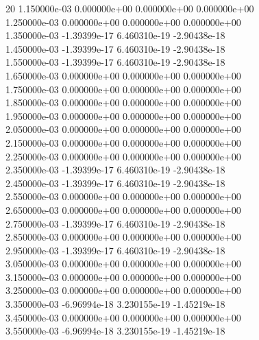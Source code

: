 20	1.150000e-03	0.000000e+00	0.000000e+00	0.000000e+00	\\ 	1.250000e-03	0.000000e+00	0.000000e+00	0.000000e+00	\\ 	1.350000e-03	-1.39399e-17	6.460310e-19	-2.90438e-18	\\ 	1.450000e-03	-1.39399e-17	6.460310e-19	-2.90438e-18	\\ 	1.550000e-03	-1.39399e-17	6.460310e-19	-2.90438e-18	\\ 	1.650000e-03	0.000000e+00	0.000000e+00	0.000000e+00	\\ 	1.750000e-03	0.000000e+00	0.000000e+00	0.000000e+00	\\ 	1.850000e-03	0.000000e+00	0.000000e+00	0.000000e+00	\\ 	1.950000e-03	0.000000e+00	0.000000e+00	0.000000e+00	\\ 	2.050000e-03	0.000000e+00	0.000000e+00	0.000000e+00	\\ 	2.150000e-03	0.000000e+00	0.000000e+00	0.000000e+00	\\ 	2.250000e-03	0.000000e+00	0.000000e+00	0.000000e+00	\\ 	2.350000e-03	-1.39399e-17	6.460310e-19	-2.90438e-18	\\ 	2.450000e-03	-1.39399e-17	6.460310e-19	-2.90438e-18	\\ 	2.550000e-03	0.000000e+00	0.000000e+00	0.000000e+00	\\ 	2.650000e-03	0.000000e+00	0.000000e+00	0.000000e+00	\\ 	2.750000e-03	-1.39399e-17	6.460310e-19	-2.90438e-18	\\ 	2.850000e-03	0.000000e+00	0.000000e+00	0.000000e+00	\\ 	2.950000e-03	-1.39399e-17	6.460310e-19	-2.90438e-18	\\ 	3.050000e-03	0.000000e+00	0.000000e+00	0.000000e+00	\\ 	3.150000e-03	0.000000e+00	0.000000e+00	0.000000e+00	\\ 	3.250000e-03	0.000000e+00	0.000000e+00	0.000000e+00	\\ 	3.350000e-03	-6.96994e-18	3.230155e-19	-1.45219e-18	\\ 	3.450000e-03	0.000000e+00	0.000000e+00	0.000000e+00	\\ 	3.550000e-03	-6.96994e-18	3.230155e-19	-1.45219e-18	\\ \hline
